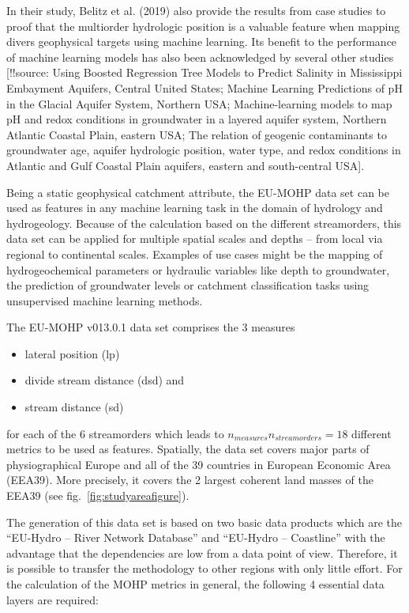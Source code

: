 \documentclass[fleqn,10pt]{wlscirep}
\providecommand{\tightlist}{%
  \setlength{\itemsep}{0pt}\setlength{\parskip}{0pt}}
\begin{document}
In their study, Belitz et al. (2019) also provide the results from case studies to proof that the multiorder hydrologic position is a valuable feature when mapping divers geophysical targets using machine learning. Its benefit to the performance of machine learning models has also been acknowledged by several other studies {[}!!source: Using Boosted Regression Tree Models to Predict Salinity in Mississippi Embayment Aquifers, Central United States; Machine Learning Predictions of pH in the Glacial Aquifer System, Northern USA; Machine-learning models to map pH and redox conditions in groundwater in a layered aquifer system, Northern Atlantic Coastal Plain, eastern USA; The relation of geogenic contaminants to groundwater age, aquifer hydrologic position, water type, and redox conditions in Atlantic and Gulf Coastal Plain aquifers, eastern and south-central USA{]}.

Being a static geophysical catchment attribute, the EU-MOHP data set can be used as features in any machine learning task in the domain of hydrology and hydrogeology. Because of the calculation based on the different streamorders, this data set can be applied for multiple spatial scales and depths -- from local via regional to continental scales. Examples of use cases might be the mapping of hydrogeochemical parameters or hydraulic variables like depth to groundwater, the prediction of groundwater levels or catchment classification tasks using unsupervised machine learning methods.

The EU-MOHP v013.0.1 data set comprises the 3 measures

\begin{itemize}
\tightlist
\item
  lateral position (lp)
\item
  divide stream distance (dsd) and
\item
  stream distance (sd)
\end{itemize}

for each of the 6 streamorders which leads to \(n_{measures}n_{streamorders} = 18\) different metrics to be used as features. Spatially, the data set covers major parts of physiographical Europe and all of the 39 countries in European Economic Area (EEA39). More precisely, it covers the 2 largest coherent land masses of the EEA39 (see fig.~\ref{fig:studyareafigure}).

The generation of this data set is based on two basic data products which are the ``EU-Hydro -- River Network Database'' and ``EU-Hydro -- Coastline'' with the advantage that the dependencies are low from a data point of view. Therefore, it is possible to transfer the methodology to other regions with only little effort. For the calculation of the MOHP metrics in general, the following 4 essential data layers are required:
\end{document}
